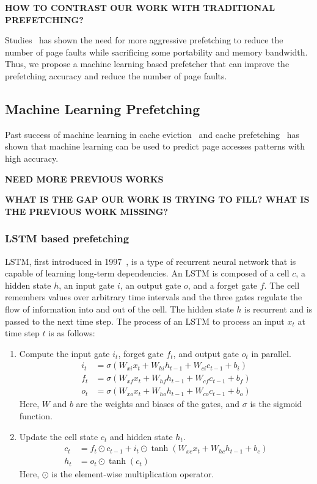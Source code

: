 \textbf{HOW TO CONTRAST OUR WORK WITH TRADITIONAL PREFETCHING?}

Studies~\cite{Aggressive} has shown the need for more aggressive prefetching to reduce the number of page faults while sacrificing some portability and memory bandwidth. Thus, we propose a machine learning based prefetcher that can improve the prefetching accuracy and reduce the number of page faults.

\subsection{Machine Learning Prefetching}
Past success of machine learning in cache eviction~\cite{RelaxedBelady} and cache prefetching~\cite{LMAP} has shown that machine learning can be used to predict page accesses patterns with high accuracy.

\textbf{NEED MORE PREVIOUS WORKS}

\textbf{WHAT IS THE GAP OUR WORK IS TRYING TO FILL? WHAT IS THE PREVIOUS WORK MISSING?}

\subsubsection{LSTM based prefetching}

LSTM, first introduced in 1997~\cite{LSTM}, is a type of recurrent neural network that is capable of learning long-term dependencies. An LSTM is composed of a cell $c$, a hidden state $h$, an input gate $i$, an output gate $o$, and a forget gate $f$. The cell remembers values over arbitrary time intervals and the three gates regulate the flow of information into and out of the cell. The hidden state $h$ is recurrent and is passed to the next time step. The process of an LSTM to process an input $x_t$ at time step $t$ is as follows:

\begin{enumerate}
    \item Compute the input gate $i_t$, forget gate $f_t$, and output gate $o_t$ in parallel.\begin{align*}
        i_t &= \sigma(W_{xi}x_t + W_{hi}h_{t-1} + W_{ci}c_{t-1} + b_i)\\
        f_t &= \sigma(W_{xf}x_t + W_{hf}h_{t-1} + W_{cf}c_{t-1} + b_f)\\
        o_t &= \sigma(W_{xo}x_t + W_{ho}h_{t-1} + W_{co}c_{t-1} + b_o)
    \end{align*}
    Here, $W$ and $b$ are the weights and biases of the gates, and $\sigma$ is the sigmoid function.
    \item Update the cell state $c_t$ and hidden state $h_t$.\begin{align*}
        c_t &= f_t \odot c_{t-1} + i_t \odot \tanh(W_{xc}x_t + W_{hc}h_{t-1} + b_c)\\
        h_t &= o_t \odot \tanh(c_t)
    \end{align*}
    Here, $\odot$ is the element-wise multiplication operator.
\end{enumerate}

